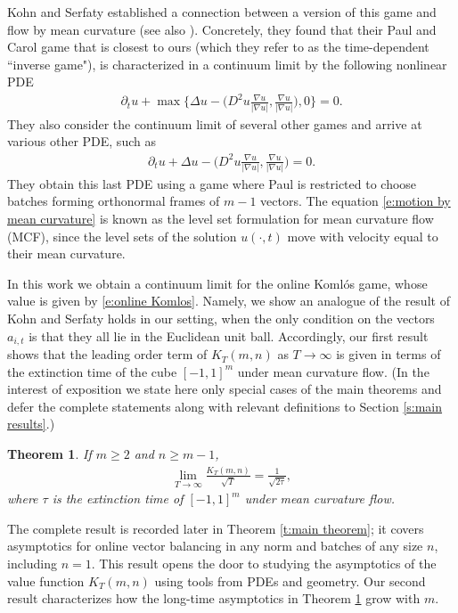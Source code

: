 \documentclass[reqno]{amsart}
\newtheorem{theorem}{Theorem}[section]
\numberwithin{equation}{section}
\begin{document}
Kohn and Serfaty \cite{KohnSerfaty2006} established a connection between a version of this game and flow by mean curvature (see also \cite{kohn07}). Concretely, they found that their Paul and Carol game that is closest to ours (which they refer to as the time-dependent ``inverse game"), is characterized in a continuum limit by the following nonlinear PDE
\begin{align*}
  \partial_tu + \max\big \{\Delta u-\big(D^2u \tfrac{\nabla u}{|\nabla u|},\tfrac{\nabla u}{|\nabla u|}\big),0\big \} = 0.
\end{align*}
They also consider the continuum limit of several other games and arrive at various other PDE, such as 
\begin{align}\label{e:motion by mean curvature}
  \partial_tu + \Delta u-\big(D^2u \tfrac{\nabla u}{|\nabla u|},\tfrac{\nabla u}{|\nabla u|}\big) = 0.
\end{align}
They obtain this last PDE using a game where Paul is restricted to choose batches forming orthonormal frames of $m-1$ vectors. The equation \eqref{e:motion by mean curvature} is known as the level set formulation for mean curvature flow (MCF), since the level sets of the solution $u(\cdot,t)$ move with velocity equal to their mean curvature.

In this work we obtain a continuum limit for the online Koml\'os game, whose value is given by \eqref{e:online Komlos}. Namely, we show an analogue of the result of Kohn and Serfaty holds in our setting, when the only condition on the vectors $a_{i,t}$ is that they all lie in the Euclidean unit ball. Accordingly, our  first result shows that the leading order term of $K_{T}(m,n)$ as $T\to \infty$ is given in terms of  the extinction time of the cube $[-1,1]^m$ under mean curvature flow.  (In the interest of exposition we state here only special cases of the main theorems and defer the complete statements along with relevant definitions to Section \ref{s:main results}.) 

\begin{theorem}\label{thm:main}
If $m \geq 2$ and $n\geq m-1$, 
\begin{align*}
\lim_{T\to\infty} \frac{K_{T}(m,n)}{\sqrt{T}}  =  \frac{1}{\sqrt{2\tau}}, 
\end{align*}
where $\tau$ is the extinction time of $[-1,1]^m$ under mean curvature flow. 

\end{theorem}

The complete result is recorded later in Theorem \ref{t:main theorem}; it covers asymptotics for online vector balancing in any norm and  batches of any size $n$, including $n=1$. This result opens the door to studying the asymptotics of the value function $K_{T}(m,n)$ using tools from PDEs and geometry. Our second result characterizes how the long-time asymptotics in Theorem \ref{thm:main} grow with $m$.
\end{document}
